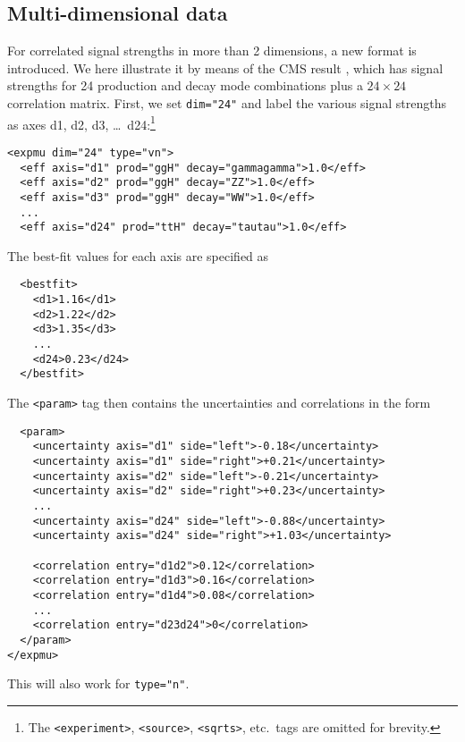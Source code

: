 \subsection*{Multi-dimensional data}

For correlated signal strengths in more than 2 dimensions, a new format is introduced. 
We here illustrate it by means of the CMS result \cite{Sirunyan:2018koj}, 
which has signal strengths for 24 production and decay mode combinations plus a $24\times 24$ correlation matrix. 
First, we set {\tt dim="24"} and label the various signal strengths as axes d1, d2, d3, \ldots~d24:\footnote{The {\tt <experiment>}, {\tt <source>},  {\tt <sqrts>}, etc.\ tags are omitted for brevity.} 

\begin{verbatim}
<expmu dim="24" type="vn">
  <eff axis="d1" prod="ggH" decay="gammagamma">1.0</eff>
  <eff axis="d2" prod="ggH" decay="ZZ">1.0</eff>
  <eff axis="d3" prod="ggH" decay="WW">1.0</eff>
  ...
  <eff axis="d24" prod="ttH" decay="tautau">1.0</eff>  
\end{verbatim}
The best-fit values for each axis are specified as 
\begin{verbatim}
  <bestfit>
    <d1>1.16</d1>
    <d2>1.22</d2>
    <d3>1.35</d3>
    ...
    <d24>0.23</d24>
  </bestfit>
\end{verbatim}
The {\tt <param>} tag then contains the uncertainties and correlations in the form
\begin{verbatim}
  <param>
    <uncertainty axis="d1" side="left">-0.18</uncertainty>
    <uncertainty axis="d1" side="right">+0.21</uncertainty>
    <uncertainty axis="d2" side="left">-0.21</uncertainty>
    <uncertainty axis="d2" side="right">+0.23</uncertainty>
    ...
    <uncertainty axis="d24" side="left">-0.88</uncertainty>
    <uncertainty axis="d24" side="right">+1.03</uncertainty>
	
    <correlation entry="d1d2">0.12</correlation>
    <correlation entry="d1d3">0.16</correlation>
    <correlation entry="d1d4">0.08</correlation>
    ...
    <correlation entry="d23d24">0</correlation>   
  </param>
</expmu>
\end{verbatim}

\noindent
This will also work for {\tt type="n"}.
